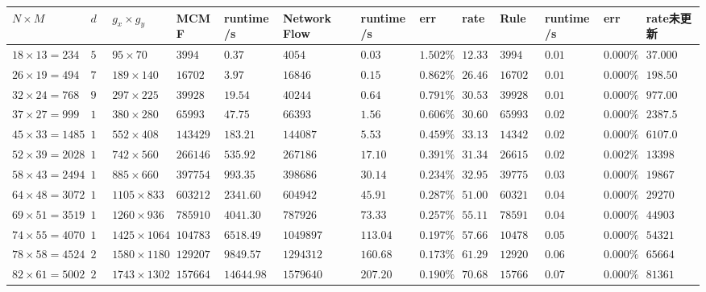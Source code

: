 \documentclass[]{article}
\begin{document}
\begin{longtable}[c]{@{}lllllllllllll@{}}
\toprule
\(N\times M\) & \(d\) & \(g_x\times g_y\) & MCMF & runtime/s & Network
Flow & runtime/s & err & rate & Rule & runtime/s & err &
rate未更新\tabularnewline
\midrule
\endhead
\(18\times 13 =234\) & \(5\) & \(95\times 70\) & \(3994\) & \(0.37\) &
\(4054\) & \(0.03\) & \(1.502\%\) & \(12.333\) & \(3994\) & \(0.01\) &
\(0.000\%\) & \(37.000\)\tabularnewline
\(26\times 19 =494\) & \(7\) & \(189\times 140\) & \(16702\) & \(3.97\)
& \(16846\) & \(0.15\) & \(0.862\%\) & \(26.467\) & \(16702\) & \(0.01\)
& \(0.000\%\) & \(198.50\)\tabularnewline
\(32\times 24 =768\) & \(9\) & \(297\times 225\) & \(39928\) & \(19.54\)
& \(40244\) & \(0.64\) & \(0.791\%\) & \(30.531\) & \(39928\) & \(0.01\)
& \(0.000\%\) & \(977.00\)\tabularnewline
\(37\times 27 =999\) & \(10\) & \(380\times 280\) & \(65993\) &
\(47.75\) & \(66393\) & \(1.56\) & \(0.606\%\) & \(30.609\) & \(65993\)
& \(0.02\) & \(0.000\%\) & \(2387.5\)\tabularnewline
\(45\times 33 =1485\) & \(12\) & \(552\times 408\) & \(143429\) &
\(183.21\) & \(144087\) & \(5.53\) & \(0.459\%\) & \(33.130\) &
\(143429\) & \(0.02\) & \(0.000\%\) & \(6107.0\)\tabularnewline
\(52\times 39 =2028\) & \(14\) & \(742\times 560\) & \(266146\) &
\(535.92\) & \(267186\) & \(17.10\) & \(0.391\%\) & \(31.340\) &
\(266150\) & \(0.02\) & \(0.002\%\) & \(13398\)\tabularnewline
\(58\times 43 =2494\) & \(15\) & \(885\times 660\) & \(397754\) &
\(993.35\) & \(398686\) & \(30.14\) & \(0.234\%\) & \(32.958\) &
\(397754\) & \(0.03\) & \(0.000\%\) & \(19867\)\tabularnewline
\(64\times 48 =3072\) & \(17\) & \(1105\times 833\) & \(603212\) &
\(2341.60\) & \(604942\) & \(45.91\) & \(0.287\%\) & \(51.004\) &
\(603212\) & \(0.04\) & \(0.000\%\) & \(29270\)\tabularnewline
\(69\times 51 =3519\) & \(18\) & \(1260\times 936\) & \(785910\) &
\(4041.30\) & \(787926\) & \(73.33\) & \(0.257\%\) & \(55.111\) &
\(785910\) & \(0.04\) & \(0.000\%\) & \(44903\)\tabularnewline
\(74\times 55 =4070\) & \(19\) & \(1425\times 1064\) & \(1047830\) &
\(6518.49\) & \(1049897\) & \(113.04\) & \(0.197\%\) & \(57.665\) &
\(1047830\) & \(0.05\) & \(0.000\%\) & \(54321\)\tabularnewline
\(78\times 58 =4524\) & \(20\) & \(1580\times 1180\) & \(1292072\) &
\(9849.57\) & \(1294312\) & \(160.68\) & \(0.173\%\) & \(61.299\) &
\(1292072\) & \(0.06\) & \(0.000\%\) & \(65664\)\tabularnewline
\(82\times 61 =5002\) & \(21\) & \(1743\times 1302\) & \(1576642\) &
\(14644.98\) & \(1579640\) & \(207.20\) & \(0.190\%\) & \(70.680\) &
\(1576642\) & \(0.07\) & \(0.000\%\) & \(81361\)\tabularnewline
\bottomrule
\end{longtable}
\end{document}
